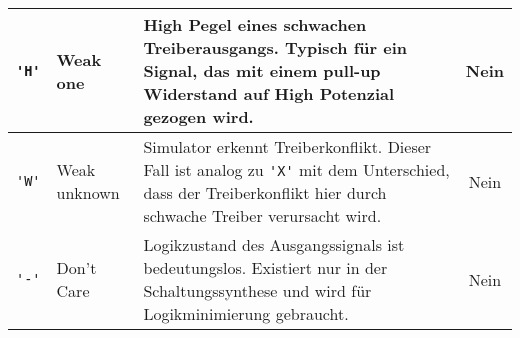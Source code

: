 \begin{center}
\begin{adjustbox}{max width=\columnwidth}
\begin{tabular}{|l|l|p{6cm}|c|}
                \hline
                \verb|'H'| & Weak one        & High Pegel eines schwachen Treiberausgangs. Typisch für ein Signal, das mit einem pull-up Widerstand auf High Potenzial gezogen wird. & Nein \\
                \hline
                \verb|'W'| & Weak unknown    & Simulator erkennt Treiberkonflikt. Dieser Fall ist analog zu \verb|'X'| mit dem Unterschied, dass der Treiberkonflikt hier durch schwache Treiber verursacht wird. & Nein \\
                \hline
                \verb|'-'| & Don’t Care      & Logikzustand des Ausgangssignals ist bedeutungslos. Existiert nur in der Schaltungssynthese und wird für Logikminimierung gebraucht. & Nein \\
                \hline
        \end{tabular}
    \end{adjustbox}
\end{center}